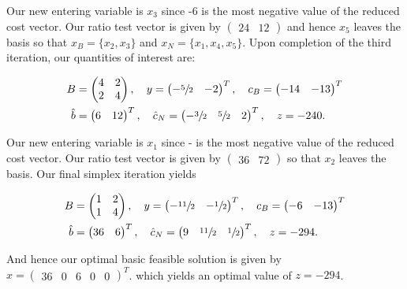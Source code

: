 \begin{solution}
  Our new entering variable is $x_3$ since -6 is the most negative value of the reduced cost vector. Our ratio test 
  vector is given by $\begin{pmatrix} 24 & 12 \end{pmatrix}$ and hence $x_5$ leaves the basis so that 
  $x_B = \{ x_2, x_3 \}$ and $x_N = \{ x_1, x_4, x_5 \}$. Upon completion of the third iteration, our quantities of 
  interest are:

  \begin{align*}
    B &= \begin{pmatrix}
      4 & 2 \\
      2 & 4
    \end{pmatrix}, \quad y = \begin{pmatrix}
      -\sfrac{5}{2} & -2
    \end{pmatrix}^T, \quad c_B = \begin{pmatrix}
      -14 & -13
    \end{pmatrix}^T \\
    \hat{b} &= \begin{pmatrix}
      6 & 12
    \end{pmatrix}^T, \quad \hat{c}_N = \begin{pmatrix}
      -\sfrac{3}{2} & \sfrac{5}{2} & 2
    \end{pmatrix}^T, \quad z = -240.
  \end{align*}

  Our new entering variable is $x_1$ since - is the most negative value of the reduced cost vector. Our
  ratio test vector is given by $\begin{pmatrix} 36 & 72 \end{pmatrix}$ so that $x_2$ leaves the basis. Our final
  simplex iteration yields


  \begin{align*}
    B &= \begin{pmatrix}
      1 & 2 \\
      1 & 4
    \end{pmatrix}, \quad y = \begin{pmatrix}
      -\sfrac{11}{2} & -\sfrac{1}{2}
    \end{pmatrix}^T, \quad c_B = \begin{pmatrix}
      -6 & -13
    \end{pmatrix}^T \\
    \hat{b} &= \begin{pmatrix}
      36 & 6
    \end{pmatrix}^T, \quad \hat{c}_N = \begin{pmatrix}
      9 & \sfrac{11}{2} & \sfrac{1}{2}
    \end{pmatrix}^T, \quad z = -294.
  \end{align*}

  And hence our optimal basic feasible solution is given by $x = \begin{pmatrix} 36 & 0 & 6 & 0 & 0 \end{pmatrix}^T$.
  which yields an optimal value of $z = -294$.
\end{solution}
